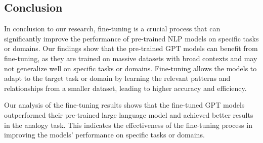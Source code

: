 \documentclass[a0,landscape]{a0poster}
\begin{document}
\begin{multicols}{4}
\color{Teal}
\section*{Conclusion}
\color{Black}



In conclusion to our research, fine-tuning is a crucial process that can significantly improve the performance of pre-trained NLP models on specific tasks or domains. Our findings show that the pre-trained GPT models can benefit from fine-tuning, as they are trained on massive datasets with broad contexts and may not generalize well on specific tasks or domains. Fine-tuning allows the models to adapt to the target task or domain by learning the relevant patterns and relationships from a smaller dataset, leading to higher accuracy and efficiency.

\vspace{1cm}
Our analysis of the fine-tuning results shows that the fine-tuned GPT models outperformed their pre-trained large language model and achieved better results in the analogy task. This indicates the effectiveness of the fine-tuning process in improving the models' performance on specific tasks or domains.








\end{multicols}
\end{document}
